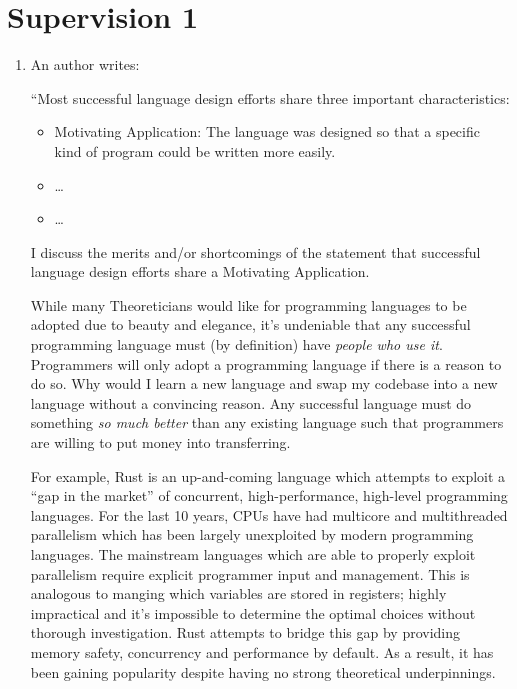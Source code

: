 \documentclass[10pt,\jkfside,a4paper]{article}
\begin{document}
\section*{Supervision 1}

\begin{enumerate}

\item An author writes:

``Most successful language design efforts share three important
characteristics:

\begin{itemize}

\item Motivating Application: The language was designed so that a specific
kind of program could be written more easily.

\item \dots

\item \dots

\end{itemize}

I discuss the merits and/or shortcomings of the statement that
successful language design efforts share a Motivating Application.

While many Theoreticians would like for programming languages to be adopted
due to beauty and elegance, it's undeniable that any successful programming
language must (by definition) have \textit{people who use it}. Programmers
will only adopt a programming language if there is a reason to do so. Why
would I learn a new language and swap my codebase into a new language
without a convincing reason. Any successful language must do something
\textit{so much better} than any existing language such that programmers are
willing to put money into transferring.

For example, Rust is an up-and-coming language which attempts to exploit a
``gap in the market'' of concurrent, high-performance, high-level programming
languages. For the last 10 years, CPUs have had multicore and multithreaded
parallelism which has been largely unexploited by modern programming
languages. The mainstream languages which are able to properly exploit
parallelism require explicit programmer input and management. This is
analogous to manging which variables are stored in registers; highly
impractical and it's impossible to determine the optimal choices without
thorough investigation. Rust attempts to bridge this gap by providing memory
safety, concurrency and performance by default. As a result, it has been
gaining popularity despite having no strong theoretical underpinnings.


\end{enumerate}
\end{document}
